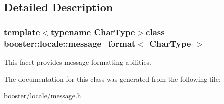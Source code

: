 \subsection{Detailed Description}
\subsubsection*{template$<$typename Char\-Type$>$class booster\-::locale\-::message\-\_\-format$<$ Char\-Type $>$}

This facet provides message formatting abilities. 

The documentation for this class was generated from the following file\-:\begin{DoxyCompactItemize}
\item 
booster/locale/message.\-h\end{DoxyCompactItemize}
